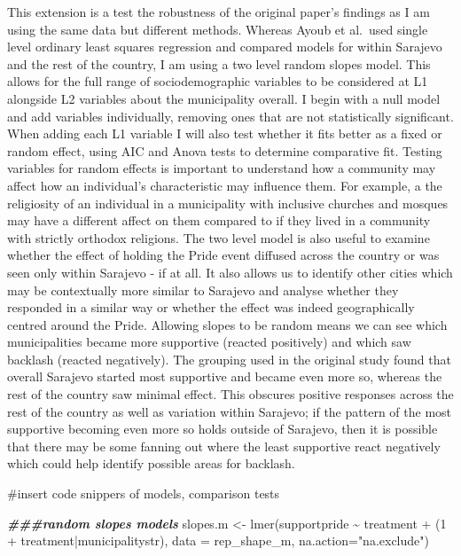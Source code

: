 \documentclass[
]{article}
\newenvironment{Shaded}{\begin{snugshade}}{\end{snugshade}}
\newcommand{\AttributeTok}[1]{\textcolor[rgb]{0.77,0.63,0.00}{#1}}
\newcommand{\DecValTok}[1]{\textcolor[rgb]{0.00,0.00,0.81}{#1}}
\newcommand{\DocumentationTok}[1]{\textcolor[rgb]{0.56,0.35,0.01}{\textbf{\textit{#1}}}}
\newcommand{\FunctionTok}[1]{\textcolor[rgb]{0.00,0.00,0.00}{#1}}
\newcommand{\NormalTok}[1]{#1}
\newcommand{\OtherTok}[1]{\textcolor[rgb]{0.56,0.35,0.01}{#1}}
\newcommand{\SpecialCharTok}[1]{\textcolor[rgb]{0.00,0.00,0.00}{#1}}
\newcommand{\StringTok}[1]{\textcolor[rgb]{0.31,0.60,0.02}{#1}}
\begin{document}
This extension is a test the robustness of the original paper's findings
as I am using the same data but different methods. Whereas Ayoub et
al.~used single level ordinary least squares regression and compared
models for within Sarajevo and the rest of the country, I am using a two
level random slopes model. This allows for the full range of
sociodemographic variables to be considered at L1 alongside L2 variables
about the municipality overall. I begin with a null model and add
variables individually, removing ones that are not statistically
significant. When adding each L1 variable I will also test whether it
fits better as a fixed or random effect, using AIC and Anova tests to
determine comparative fit. Testing variables for random effects is
important to understand how a community may affect how an individual's
characteristic may influence them. For example, a the religiosity of an
individual in a municipality with inclusive churches and mosques may
have a different affect on them compared to if they lived in a community
with strictly orthodox religions. The two level model is also useful to
examine whether the effect of holding the Pride event diffused across
the country or was seen only within Sarajevo - if at all. It also allows
us to identify other cities which may be contextually more similar to
Sarajevo and analyse whether they responded in a similar way or whether
the effect was indeed geographically centred around the Pride. Allowing
slopes to be random means we can see which municipalities became more
supportive (reacted positively) and which saw backlash (reacted
negatively). The grouping used in the original study found that overall
Sarajevo started most supportive and became even more so, whereas the
rest of the country saw minimal effect. This obscures positive responses
across the rest of the country as well as variation within Sarajevo; if
the pattern of the most supportive becoming even more so holds outside
of Sarajevo, then it is possible that there may be some fanning out
where the least supportive react negatively which could help identify
possible areas for backlash.

\#insert code snippers of models, comparison tests

\begin{Shaded}
\begin{Highlighting}[]
\DocumentationTok{\#\#\#random slopes models}
\NormalTok{slopes.m }\OtherTok{\textless{}{-}} \FunctionTok{lmer}\NormalTok{(supportpride }\SpecialCharTok{\textasciitilde{}}\NormalTok{ treatment }\SpecialCharTok{+}\NormalTok{ (}\DecValTok{1} \SpecialCharTok{+}\NormalTok{ treatment}\SpecialCharTok{|}\NormalTok{municipalitystr), }\AttributeTok{data =}\NormalTok{ rep\_shape\_m, }\AttributeTok{na.action=}\StringTok{"na.exclude"}\NormalTok{)}
\end{Highlighting}
\end{Shaded}
\end{document}
